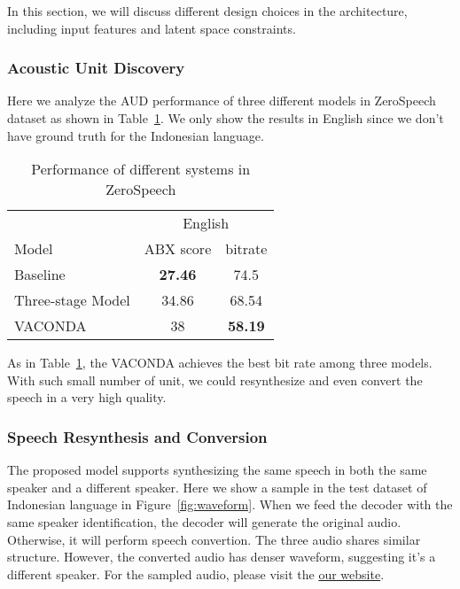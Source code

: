 In this section, we will discuss different design choices in the architecture, including input features and latent space constraints. 



\subsubsection{Acoustic Unit Discovery}

Here we analyze the AUD performance of three different models in ZeroSpeech dataset as shown in Table~\ref{tab:aud}. We only show the results in English since we don't have ground truth for the Indonesian language.


\renewcommand{\arraystretch}{1.1}
\begin{table}[!htbp]
\caption{Performance of different systems in ZeroSpeech}
\centering
\begin{tabular}{l c c}\toprule[\heavyrulewidth]
& \multicolumn{2}{c}{English}\\
Model & ABX score & bitrate \\
\toprule[\heavyrulewidth]
Baseline & \textbf{27.46} & 74.5\\
Three-stage Model & 34.86 & 68.54 \\
VACONDA & 38 & \textbf{58.19} \\

\bottomrule[\heavyrulewidth]
\end{tabular}
\label{tab:aud}
\end{table}

As in Table~\ref{tab:aud}, the VACONDA achieves the best bit rate among three models. With such small number of unit, we could resynthesize and even convert the speech in a very high quality.

\subsubsection{Speech Resynthesis and Conversion}

The proposed model supports synthesizing the same speech in both the same speaker and a different speaker. Here we show a sample in the test dataset of Indonesian language in Figure~\ref{fig:waveform}. When we feed the decoder with the same speaker identification, the decoder will generate the original audio. Otherwise, it will perform speech convertion. The three audio shares similar structure.  However, the converted audio has denser waveform, suggesting it's a different speaker. For the sampled audio, please visit the \href{http://tts.speech.cs.cmu.edu/rsk/campaigns/interspeech2019/submissions/acoustic_unit_discovery/}{our website}.



